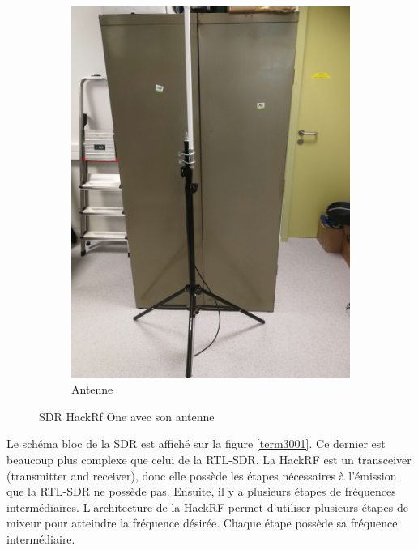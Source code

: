 \begin{figure}[h]
\begin{subfigure}{0.4\textwidth}
\end{subfigure}
\hspace{0.5cm} %
\begin{subfigure}{0.4\textwidth}
  \centering
  \includegraphics[width=\textwidth]{images/pied.png}
  \caption{Antenne}
  \label{term340}
\end{subfigure}
\caption{SDR HackRf One avec son antenne}
\label{bothimages}
\end{figure}


Le schéma bloc de la \ac{SDR} est affiché sur la figure \ref{term3001}. Ce dernier est beaucoup plus complexe que celui de la RTL-SDR. La HackRF est un transceiver (transmitter and receiver), donc elle possède les étapes nécessaires à l'émission que la RTL-SDR ne possède pas. Ensuite, il y a plusieurs étapes de fréquences intermédiaires. L'architecture de la HackRF \footnotemark[10] permet d'utiliser plusieurs étapes de mixeur pour atteindre la fréquence désirée. Chaque étape possède sa fréquence intermédiaire.

